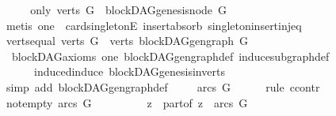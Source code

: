 \begin{isabellebody}
\ \ \isamarkupfalse%
\ \isamarkupfalse%
\ only{\isacharcolon}{\kern0pt}\ {\isachardoublequoteopen}verts\ G\ {\isacharequal}{\kern0pt}\ {\isacharbraceleft}{\kern0pt}blockDAG{\isachardot}{\kern0pt}genesis{\isacharunderscore}{\kern0pt}node\ G{\isacharbraceright}{\kern0pt}{\isachardoublequoteclose}\isanewline
\ \ \ \ \isamarkupfalse%
\ {\isacharparenleft}{\kern0pt}metis\ one\ \ card{\isacharunderscore}{\kern0pt}{}{\isacharunderscore}{\kern0pt}singletonE\ insert{\isacharunderscore}{\kern0pt}absorb\ singleton{\isacharunderscore}{\kern0pt}insert{\isacharunderscore}{\kern0pt}inj{\isacharunderscore}{\kern0pt}eq{\isacharprime}{\kern0pt}{\isacharparenright}{\kern0pt}\isanewline
\ \ \isamarkupfalse%
\ \isamarkupfalse%
\ verts{\isacharunderscore}{\kern0pt}equal{\isacharcolon}{\kern0pt}\ {\isachardoublequoteopen}verts\ G\ {\isacharequal}{\kern0pt}\ verts\ {\isacharparenleft}{\kern0pt}blockDAG{\isachardot}{\kern0pt}gen{\isacharunderscore}{\kern0pt}graph\ G{\isacharparenright}{\kern0pt}{\isachardoublequoteclose}\isanewline
\ \ \ \ \isamarkupfalse%
\ \ blockDAG{\isacharunderscore}{\kern0pt}axioms\ one\ blockDAG{\isachardot}{\kern0pt}gen{\isacharunderscore}{\kern0pt}graph{\isacharunderscore}{\kern0pt}def\ induce{\isacharunderscore}{\kern0pt}subgraph{\isacharunderscore}{\kern0pt}def\isanewline
\ \ \ \ \ \ induced{\isacharunderscore}{\kern0pt}induce\ blockDAG{\isachardot}{\kern0pt}genesis{\isacharunderscore}{\kern0pt}in{\isacharunderscore}{\kern0pt}verts\isanewline
\ \ \ \ \isamarkupfalse%
\ {\isacharparenleft}{\kern0pt}simp\ add{\isacharcolon}{\kern0pt}\ blockDAG{\isachardot}{\kern0pt}gen{\isacharunderscore}{\kern0pt}graph{\isacharunderscore}{\kern0pt}def{\isacharparenright}{\kern0pt}\ \isanewline
\ \ \isamarkupfalse%
\ {\isachardoublequoteopen}arcs\ G\ {\isacharequal}{\kern0pt}{\isacharbraceleft}{\kern0pt}{\isacharbraceright}{\kern0pt}{\isachardoublequoteclose}\ \isanewline
\ \ \isamarkupfalse%
\ {\isacharparenleft}{\kern0pt}rule\ ccontr{\isacharparenright}{\kern0pt}\isanewline
\ \ \ \ \isamarkupfalse%
\ not{\isacharunderscore}{\kern0pt}empty{\isacharcolon}{\kern0pt}\ {\isachardoublequoteopen}arcs\ G\ {\isasymnoteq}{\isacharbraceleft}{\kern0pt}{\isacharbraceright}{\kern0pt}{\isachardoublequoteclose}\ \isanewline
\ \ \ \ \isamarkupfalse%
\ \isamarkupfalse%
\ z\ \ part{\isacharunderscore}{\kern0pt}of{\isacharcolon}{\kern0pt}\ {\isachardoublequoteopen}z\ {\isasymin}\ arcs\ G{\isachardoublequoteclose}\isanewline

\end{isabellebody}
